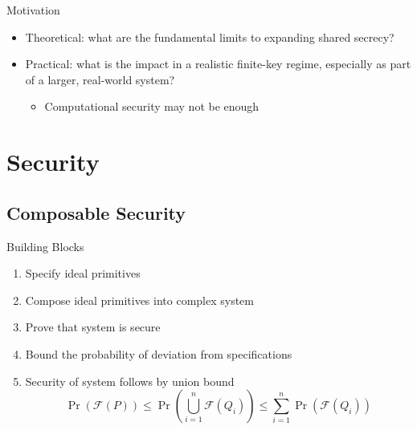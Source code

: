 \documentclass[xcolor=dvipsnames]{beamer}
\newcommand{\?}{\mathrel{?}} %
\newcommand{\Fail}{\mathcal{F}}
\begin{document}
\begin{frame}{Motivation}
  \begin{itemize}[<+->]
    \item Theoretical: what are the \alert{fundamental limits} to expanding shared secrecy?
    \item Practical: what is the impact in a \alert{realistic finite-key regime}, especially as part of a \alert{larger, real-world system}?
    \begin{itemize} \item Computational security may not be enough \end{itemize}
  \end{itemize}
\end{frame}


\section{Security}

\subsection{Composable Security}

\begin{frame}{Building Blocks}
  \begin{enumerate}[<+->]
    \item Specify ideal primitives
    \item Compose ideal primitives into complex system
    \item Prove that system is secure
    \item Bound the probability of deviation from specifications
    \item Security of system follows by union bound
      \[ \Pr(\Fail(P)) \leq \Pr\left( \bigcup_{i=1}^n \Fail(Q_i) \right) \leq \sum_{i=1}^n \Pr(\Fail(Q_i)) \]
  \end{enumerate}
\end{frame}
\end{document}
